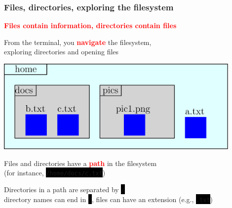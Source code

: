 \documentclass[unknownkeysallowed, 10pt, a4 paper, handout]{beamer}
\newcommand{\focus}[1]{\textbf{\textcolor{red}{#1}}}
\newcommand{\code}[1]{\colorbox{black}{\color{green}\texttt{#1}}}
\begin{document}
\begin{frame}[c]
  \begin{center}
    \frametitle{Files, directories, exploring the filesystem}

    \focus{Files contain information, directories contain files}

    From the terminal, you \focus{navigate} the filesystem,\\
    exploring directories and opening files
    \vspace{-3mm}

    \begin{center}
      \includegraphics[width=0.90\textwidth]{pics/filesystem.eps}
    \end{center}
    \vspace{-3mm}

    Files and directories have a \focus{path} in the filesystem\\
    (for instance, \code{/home/docs/c.txt})

    Directories in a path are separated by \code{/}\\
    directory names can end in \code{/}, files can have an extension
	  (e.g., \code{.txt})

  \end{center}
\end{frame}
\end{document}
